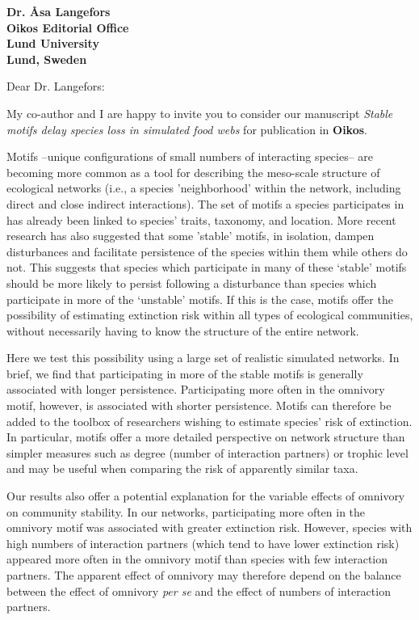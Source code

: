 \documentclass[12pt]{letter}
\begin{document}
\begin{letter}{\bf Dr. {\AA}sa Langefors \\
Oikos Editorial Office \\
Lund University \\
Lund, Sweden}


\opening{Dear Dr. Langefors:}

  My co-author and I are happy to invite you to consider our manuscript
  \emph{Stable motifs delay species loss in simulated food webs} for publication in \textbf{Oikos}.


	Motifs --unique configurations of small numbers of interacting species-- are becoming more common as a tool for describing the meso-scale structure of ecological networks (i.e., a species 'neighborhood' within the network, including direct and close indirect interactions). 
	The set of motifs a species participates in has already been linked to species' traits, taxonomy, and location.
	More recent research has also suggested that some 'stable' motifs, in isolation, dampen disturbances and facilitate persistence of the species within them while others do not.
	This suggests that species which participate in many of these `stable' motifs should be more likely to persist following a disturbance than species which participate in more of the `unstable' motifs.
	If this is the case, motifs offer the possibility of estimating extinction risk within all types of ecological communities, without necessarily having to know the structure of the entire network.


	Here we test this possibility using a large set of realistic simulated networks. In brief, we find that participating in more of the stable motifs is generally associated with longer persistence. Participating more often in the omnivory motif, however, is associated with shorter persistence. Motifs can therefore be added to the toolbox of researchers wishing to estimate species' risk of extinction. In particular, motifs offer a more detailed perspective on network structure than simpler measures such as degree (number of interaction partners) or trophic level and may be useful when comparing the risk of apparently similar taxa.


 	Our results also offer a potential explanation for the variable effects of omnivory on community stability. In our networks, participating more often in the omnivory motif was associated with greater extinction risk. However, species with high numbers of interaction partners (which tend to have lower extinction risk) appeared more often in the omnivory motif than species with few interaction partners. The apparent effect of omnivory may therefore depend on the balance between the effect of omnivory \emph{per se} and the effect of numbers of interaction partners.



\end{letter}
\end{document}
